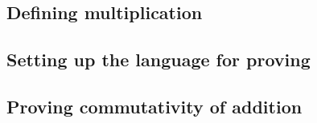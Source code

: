 \subsection{Defining multiplication}


\subsection{Setting up the language for proving}


\subsection{Proving commutativity of addition}

